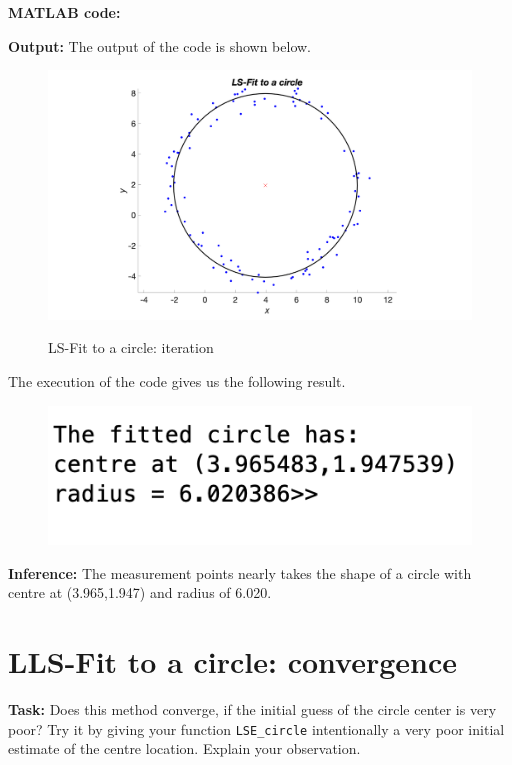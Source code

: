 \noindent \textbf{MATLAB code:} 


\noindent \textbf{Output:} The output of the code is shown below. 
\begin{figure}[H]
\centering
{\includegraphics[scale=0.13]{ass7_1.png}}
\caption{LS-Fit to a circle: iteration }
\label{LS-Fit to a circle: iteration }
\end{figure}

\noindent The execution of the code gives us the following result.
\begin{figure}[H]
\centering
{\includegraphics[scale=0.75]{ass7_2.png}}
\end{figure}
\noindent \textbf{Inference:} The measurement points nearly takes the shape of a circle with centre at (3.965,1.947) and radius of 6.020.



\section{ LLS-Fit to a circle: convergence}  \label{ LS-Fit to a circle: convergence }
\noindent \textbf{Task:} Does this method converge, if the initial guess of the circle center is very poor? Try it by giving your function \texttt{LSE\_circle} intentionally a very poor initial estimate of the centre location. Explain your observation.\\

